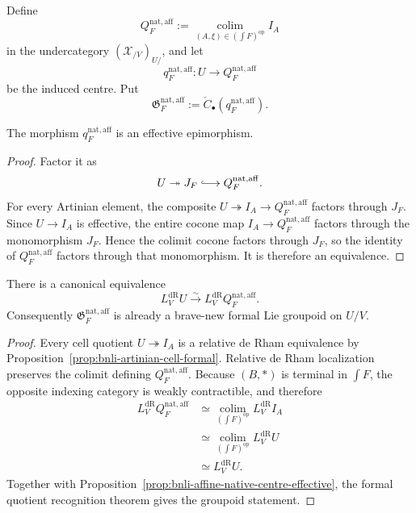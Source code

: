 \begin{definition}
\label{def:bnli-effective-leaf-image}
Define
\[
\boxed{
    Q_F^{\mathrm{nat,aff}}
    :=
    \operatorname*{colim}_{(A,\xi)\in(\int F)^{\mathrm{op}}}I_A}
\]
in the undercategory $(\mathcal X_{/V})_{U/}$, and let
\[
    q_F^{\mathrm{nat,aff}}:
    U\longrightarrow Q_F^{\mathrm{nat,aff}}
\]
be the induced centre.  Put
\[
    \mathfrak G_F^{\mathrm{nat,aff}}
    :=
    \check C_\bullet(q_F^{\mathrm{nat,aff}}).
\]
\end{definition}

\begin{proposition}
\label{prop:bnli-affine-native-centre-effective}
The morphism $q_F^{\mathrm{nat,aff}}$ is an effective epimorphism.
\end{proposition}

\begin{proof}
Factor it as
\[
    U\twoheadrightarrow J_F\lhook\joinrel\longrightarrow
    Q_F^{\mathrm{nat,aff}}.
\]
For every Artinian element, the composite
$U\twoheadrightarrow I_A\to Q_F^{\mathrm{nat,aff}}$ factors through $J_F$.
Since $U\to I_A$ is effective, the entire cocone map
$I_A\to Q_F^{\mathrm{nat,aff}}$ factors through the monomorphism $J_F$.
Hence the colimit cocone factors through $J_F$, so the identity of
$Q_F^{\mathrm{nat,aff}}$ factors through that monomorphism.  It is therefore an
equivalence.
\end{proof}

\begin{theorem}
\label{thm:bnli-affine-native-quotient-formal}
There is a canonical equivalence
\[
    L_V^{\mathrm{dR}}U
    \xrightarrow{\sim}
    L_V^{\mathrm{dR}}Q_F^{\mathrm{nat,aff}}.
\]
Consequently $\mathfrak G_F^{\mathrm{nat,aff}}$ is already a brave-new formal
Lie groupoid on $U/V$.
\end{theorem}

\begin{proof}
Every cell quotient $U\twoheadrightarrow I_A$ is a relative de Rham
equivalence by Proposition~\ref{prop:bnli-artinian-cell-formal}.  Relative de
Rham localization preserves the colimit defining $Q_F^{\mathrm{nat,aff}}$.
Because $(B,*)$ is terminal in $\int F$, the opposite indexing category is
weakly contractible, and therefore
\[
\begin{aligned}
    L_V^{\mathrm{dR}}Q_F^{\mathrm{nat,aff}}
    &\simeq
    \operatorname*{colim}_{(\int F)^{\mathrm{op}}}L_V^{\mathrm{dR}}I_A\\
    &\simeq
    \operatorname*{colim}_{(\int F)^{\mathrm{op}}}L_V^{\mathrm{dR}}U\\
    &\simeq L_V^{\mathrm{dR}}U.
\end{aligned}
\]
Together with Proposition~\ref{prop:bnli-affine-native-centre-effective}, the
formal quotient recognition theorem gives the groupoid statement.
\end{proof}

